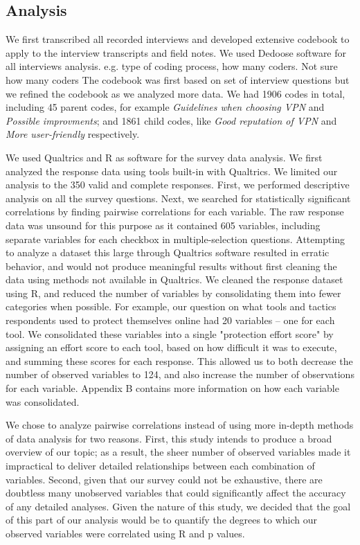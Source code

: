 \subsection{Analysis} We first transcribed all recorded interviews and
developed extensive codebook to apply to the interview transcripts and field notes. We used Dedoose software for all interviews analysis.   e.g. type of coding process, how many coders. Not sure how many coders
The codebook was first based on set of interview questions but we refined the codebook as we analyzed more data. We had 1906 codes in total, including 45 parent codes,
for example \textit{Guidelines when choosing VPN} and \textit{Possible improvments}; and 1861 child codes, like \textit{Good reputation of VPN} and \textit{More user-friendly} respectively.

We used Qualtrics and R as software for the survey data analysis. We first analyzed the
response data using tools built-in with Qualtrics. We limited our analysis to
the 350 valid and complete responses. First, we performed descriptive analysis on all the survey questions. Next, we searched for statistically
significant correlations by finding pairwise correlations for each variable.
The raw response data was unsound for this purpose as it contained 605
variables, including separate variables for each checkbox in
multiple-selection questions. Attempting to analyze a dataset this large
through Qualtrics software resulted in erratic behavior, and would not produce
meaningful results without first cleaning the data using methods not available
in Qualtrics. We cleaned the response dataset using R, and reduced the number
of variables by consolidating them into fewer categories when possible. For
example, our question on what tools and tactics respondents used to protect
themselves online had 20 variables -- one for each tool. We consolidated these
variables into a single "protection effort score" by assigning an effort score
to each tool, based on how difficult it was to execute, and summing these
scores for each response. This allowed us to both decrease the number of
observed variables to 124, and also increase the number of observations for
each variable. Appendix B contains more information on how each variable was
consolidated.

We chose to analyze pairwise correlations instead of using more in-depth
methods of data analysis for two reasons. First, this study intends to produce
a broad overview of our topic; as a result, the sheer number of observed
variables made it impractical to deliver detailed relationships between each
combination of variables. Second, given that our survey could not be
exhaustive, there are doubtless many unobserved variables that could
significantly affect the accuracy of any detailed analyses. Given the nature
of this study, we decided that the goal of this part of our analysis would be
to quantify the degrees to which our observed variables were correlated using
R and p values.

